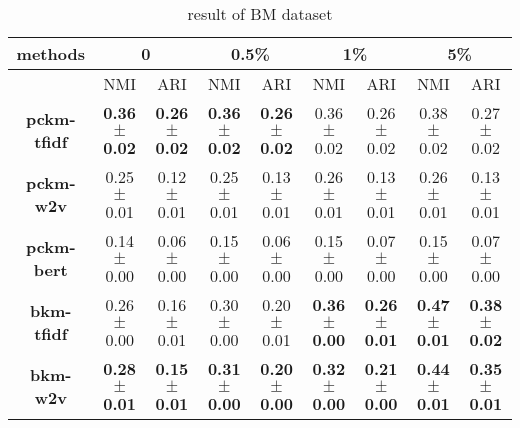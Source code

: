 \begin{table}[htbp]
\caption{result of BM dataset}
\begin{center}
\begin{tabular}{c |c|c |c|c |c|c |c|c}
\hline
\textbf{methods}
	&\multicolumn{2}{|c}{0}
	&\multicolumn{2}{|c}{0.5\%}
	&\multicolumn{2}{|c}{1\%}
	&\multicolumn{2}{|c}{5\%}
	\\\hline
& NMI&ARI & NMI&ARI & NMI&ARI & NMI&ARI \\\hline
\textbf{pckm-tfidf}
	&\textbf{0.36$\pm$0.02}		&\textbf{0.26$\pm$0.02}
	&\textbf{0.36$\pm$0.02}		&\textbf{0.26$\pm$0.02}
	&0.36$\pm$0.02		&0.26$\pm$0.02
	&0.38$\pm$0.02		&0.27$\pm$0.02
	\\\hline
\textbf{pckm-w2v}
	&0.25$\pm$0.01		&0.12$\pm$0.01
	&0.25$\pm$0.01		&0.13$\pm$0.01
	&0.26$\pm$0.01		&0.13$\pm$0.01
	&0.26$\pm$0.01		&0.13$\pm$0.01
	\\\hline
\textbf{pckm-bert}
	&0.14$\pm$0.00		&0.06$\pm$0.00
	&0.15$\pm$0.00		&0.06$\pm$0.00
	&0.15$\pm$0.00		&0.07$\pm$0.00
	&0.15$\pm$0.00		&0.07$\pm$0.00
	\\\hline
\textbf{bkm-tfidf}
	&0.26$\pm$0.00		&0.16$\pm$0.01
	&0.30$\pm$0.00		&0.20$\pm$0.01
	&\textbf{0.36$\pm$0.00}		&\textbf{0.26$\pm$0.01}
	&\textbf{0.47$\pm$0.01}		&\textbf{0.38$\pm$0.02}
	\\\hline
\textbf{bkm-w2v}
	&\textbf{0.28$\pm$0.01}		&\textbf{0.15$\pm$0.01}
	&\textbf{0.31$\pm$0.00}		&\textbf{0.20$\pm$0.00}
	&\textbf{0.32$\pm$0.00}		&\textbf{0.21$\pm$0.00}
	&\textbf{0.44$\pm$0.01}		&\textbf{0.35$\pm$0.01}
	\\\hline
\end{tabular}
\label{tb:res-bm}
\end{center}
\end{table}





